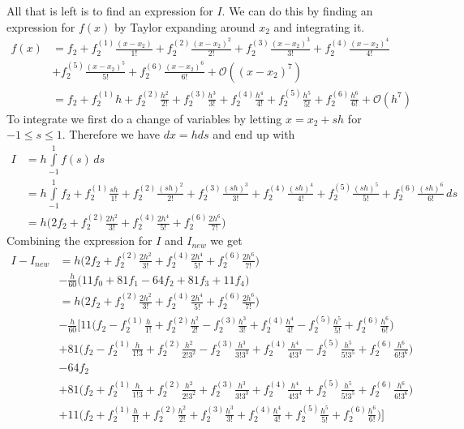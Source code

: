 \documentclass[12pt]{article}
\theoremstyle{remark}
\begin{document}
All that is left is to find an expression for $I$. We can do this by finding an expression for $f(x)$ by Taylor expanding around $x_2$ and integrating it.
\begin{align*}
	f(x) & = f_2 + f^{(1)}_2\frac{(x-x_2)}{1!} + f^{(2)}_2\frac{(x-x_2)^2}{2!} + f^{(3)}_2\frac{(x-x_2)^3}{3!} + f^{(4)}_2\frac{(x-x_2)^4}{4!}
	\\ & + f^{(5)}_2\frac{(x-x_2)^5}{5!} + f^{(6)}_2\frac{(x-x_2)^6}{6!} + \mathcal{O}((x-x_2)^7) \\
	& = f_2 + f^{(1)}_2h + f_2^{(2)}\frac{h^2}{2!} + f_2^{(3)}\frac{h^3}{3!} + f_2^{(4)}\frac{h^4}{4!} + f_2^{(5)}\frac{h^5}{5!} + f_2^{(6)}\frac{h^6}{6!} + \mathcal{O}(h^7)
\end{align*}
To integrate we first do a change of variables by letting $x = x_2 + sh$ for $-1 \leq s \leq 1$. Therefore we have $dx = hds$ and end up with
\begin{align*}
	I & = h\int\limits_{-1}^1 f(s) \, ds
	\\ & = h\int\limits_{-1}^1 f_2 + f^{(1)}_2\frac{sh}{1!} + f_2^{(2)}\frac{(sh)^2}{2!} + f_2^{(3)}\frac{(sh)^3}{3!} + f_2^{(4)}\frac{(sh)^4}{4!} + f_2^{(5)}\frac{(sh)^5}{5!} + f_2^{(6)}\frac{(sh)^6}{6!} \, ds
	\\ & = h\bigg(2f_2 + f_2^{(2)}\frac{2h^2}{3!} + f_2^{(4)}\frac{2h^4}{5!} + f_2^{(6)}\frac{2h^6}{7!}\bigg)
\end{align*}
Combining the expression for $I$ and $I_{new}$ we get
\begin{align*}
	I - I_{new} & = h\bigg(2f_2 + f_2^{(2)}\frac{2h^2}{3!} + f_2^{(4)}\frac{2h^4}{5!} + f_2^{(6)}\frac{2h^6}{7!}\bigg) 
	\\ & - \frac{h}{60}\bigg(11f_0 + 81f_1 - 64f_2 + 81f_3 + 11f_4 \bigg)
	\\ & = h\bigg(2f_2 + f_2^{(2)}\frac{2h^2}{3!} + f_2^{(4)}\frac{2h^4}{5!} + f_2^{(6)}\frac{2h^6}{7!}\bigg)
	\\ & - \frac{h}{60}\bigg[11\bigg(f_2 - f_2^{(1)}\frac{h}{1!} + f_2^{(2)}\frac{h^2}{2!} - f_2^{(3)}\frac{h^3}{3!} + f_2^{(4)}\frac{h^4}{4!} - f_2^{(5)}\frac{h^5}{5!} + f_2^{(6)}\frac{h^6}{6!}\bigg)
	\\ & + 81\bigg(f_2 - f_2^{(1)}\frac{h}{1!3} + f_2^{(2)}\frac{h^2}{2!3^2} - f_2^{(3)}\frac{h^3}{3!3^3} + f_2^{(4)}\frac{h^4}{4!3^4} - f_2^{(5)}\frac{h^5}{5!3^5} + f_2^{(6)}\frac{h^6}{6!3^6}\bigg)
	\\ & - 64f_2
	\\ & + 81\bigg(f_2 + f_2^{(1)}\frac{h}{1!3} + f_2^{(2)}\frac{h^2}{2!3^2} + f_2^{(3)}\frac{h^3}{3!3^3} + f_2^{(4)}\frac{h^4}{4!3^4} + f_2^{(5)}\frac{h^5}{5!3^5} + f_2^{(6)}\frac{h^6}{6!3^6}\bigg)
	\\ & + 11\bigg(f_2 + f_2^{(1)}\frac{h}{1!} + f_2^{(2)}\frac{h^2}{2!} + f_2^{(3)}\frac{h^3}{3!} + f_2^{(4)}\frac{h^4}{4!} + f_2^{(5)}\frac{h^5}{5!} + f_2^{(6)}\frac{h^6}{6!}\bigg)\bigg]
\end{align*}
\end{document}
